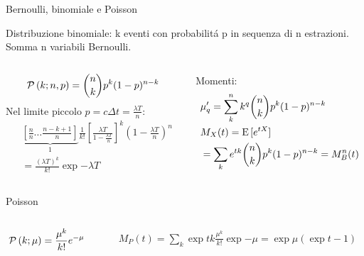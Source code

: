 \begin{frame}{Bernoulli, binomiale e Poisson}
\begin{block}{Distribuzione binomiale: k eventi con probabilit\'a p in sequenza di n estrazioni. Somma n variabili Bernoulli.}
\begin{columns}[T]
\begin{column}{0.5\textwidth}
\[\operatorname{\mathcal{P}}{(k;n,p)}=\binom{n}{k}p^k(1-p)^{n-k}\]
Nel limite piccolo $p=c\Delta t=\frac{\lambda T}{n}$:
\begin{align*}
&\underbrace{[\frac{n}{n}\ldots\frac{n-k+1}{n}]}_{1}\frac{1}{k!}[\frac{\lambda T}{1-\frac{\lambda T}{n}}]^k(1-\frac{\lambda T}{n})^n\\
&=\frac{(\lambda T)^k}{k!}\exp{-\lambda T}
\end{align*}
\end{column}
\begin{column}{0.5\textwidth}
Momenti:
\begin{align*}
&\mu'_q=\sum_k^nk^q\binom{n}{k}p^k(1-p)^{n-k}\\
&M_X(t)=\operatorname{E}{[e^{tX}]}\\
&=\sum_ke^{tk}\binom{n}{k}p^k(1-p)^{n-k}=M_B^n(t)
\end{align*}
\end{column}
\end{columns}
\end{block}
\begin{block}{Poisson}
\begin{columns}[T]
\begin{column}{0.5\textwidth}
\[\operatorname{\mathcal{P}}{(k;\mu)}=\frac{\mu^k}{k!}e^{-\mu}\]
\end{column}
\begin{column}{0.5\textwidth}
\begin{align*}
&M_P(t)=\sum_k\exp{tk}\frac{\mu^k}{k!}\exp{-\mu}=\exp{\mu(\exp{t}-1)}
\end{align*}
\end{column}
\end{columns}
\end{block}
\end{frame}

